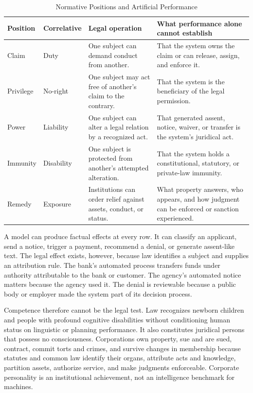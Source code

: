 \begin{table}[htbp]
\centering
\caption{Normative Positions and Artificial Performance}
\label{tab:hohfeld}
\small
\begin{tabularx}{\textwidth}{>{\raggedright\arraybackslash}p{} >{\raggedright\arraybackslash}p{} >{\raggedright\arraybackslash}p{} >{\raggedright\arraybackslash}X}
\toprule
Position & Correlative & Legal operation & What performance alone cannot establish \\
\midrule
Claim & Duty & One subject can demand conduct from another. & That the system owns the claim or can release, assign, and enforce it. \\
Privilege & No-right & One subject may act free of another's claim to the contrary. & That the system is the beneficiary of the legal permission. \\
Power & Liability & One subject can alter a legal relation by a recognized act. & That generated assent, notice, waiver, or transfer is the system's juridical act. \\
Immunity & Disability & One subject is protected from another's attempted alteration. & That the system holds a constitutional, statutory, or private-law immunity. \\
Remedy & Exposure & Institutions can order relief against assets, conduct, or status. & What property answers, who appears, and how judgment can be enforced or sanction experienced. \\
\bottomrule
\end{tabularx}
\end{table}

A model can produce factual effects at every row. It can classify an applicant, send a notice, trigger a payment, recommend a denial, or generate assent-like text. The legal effect exists, however, because law identifies a subject and supplies an attribution rule. The bank's automated process transfers funds under authority attributable to the bank or customer. The agency's automated notice matters because the agency used it. The denial is reviewable because a public body or employer made the system part of its decision process.

Competence therefore cannot be the legal test. Law recognizes newborn children and people with profound cognitive disabilities without conditioning human status on linguistic or planning performance. It also constitutes juridical persons that possess no consciousness. Corporations own property, sue and are sued, contract, commit torts and crimes, and survive changes in membership because statutes and common law identify their organs, attribute acts and knowledge, partition assets, authorize service, and make judgments enforceable. Corporate personality is an institutional achievement, not an intelligence benchmark for machines.

